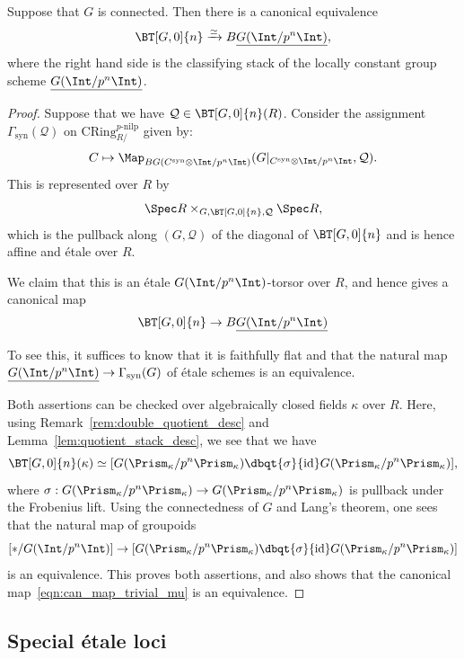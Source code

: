 \documentclass[10pt]{amsart}
\begin{document}
\begin{proposition}
\label{prop:trivial_mu}
Suppose that $G$ is connected. Then there is a canonical equivalence
\[
\BT[G,0]{n}\xrightarrow{\simeq}B\underline{G(\Int/p^n\Int)},
\]
where the right hand side is the classifying stack of the locally constant group scheme $\underline{G(\Int/p^n\Int)}$.
\end{proposition}
\begin{proof}
Suppose that we have $\mathcal{Q}\in \BT[G,0]{n}(R)$. Consider the assignment $\Gamma_{\mathrm{syn}}(\mathcal{Q})$ on $\mathrm{CRing}^{p\text{-nilp}}_{R/}$ given by:
\[
C\mapsto \Map_{BG(C^{\mathrm{syn}}\otimes\Int/p^n\Int)}(G\rvert_{C^{\mathrm{syn}}\otimes\Int/p^n\Int},\mathcal{Q}).   
\]
This is represented over $R$ by
\[
\Spec R\times_{G,\BT[G,0]{n},\mathcal{Q}}\Spec R,
\]
which is the pullback along $(G,\mathcal{Q})$ of the diagonal of $\BT[G,0]{n}$ and is hence affine and \'etale over $R$.

We claim that this is an \'etale $G(\Int/p^n\Int)$-torsor over $R$, and hence gives a canonical map
\begin{align}\label{eqn:can_map_trivial_mu}
\BT[G,0]{n}\to B\underline{G(\Int/p^n\Int)}
\end{align}

To see this, it suffices to know that it is faithfully flat and that the natural map $\underline{G(\Int/p^n\Int)}\to \Gamma_{\mathrm{syn}}(G)$ of \'etale schemes is an equivalence.

Both assertions can be checked over algebraically closed fields $\kappa$ over $R$. Here, using Remark~\ref{rem:double_quotient_desc} and Lemma~\ref{lem:quotient_stack_desc}, we see that we have
\[
\BT[G,0]{n}(\kappa)\simeq [G(\Prism_{\kappa}/p^n\Prism_{\kappa})\dbqt{\sigma}{\mathrm{id}}G(\Prism_{\kappa}/p^n\Prism_{\kappa})],
\]
where $\sigma:G(\Prism_{\kappa}/p^n\Prism_{\kappa})\to G(\Prism_{\kappa}/p^n\Prism_{\kappa})$ is pullback under the Frobenius lift. Using the connectedness of $G$ and Lang's theorem, one sees that the natural map of groupoids
\[
[*/G(\Int/p^n\Int)]\to [G(\Prism_{\kappa}/p^n\Prism_{\kappa})\dbqt{\sigma}{\mathrm{id}}G(\Prism_{\kappa}/p^n\Prism_{\kappa})]
\]
is an equivalence. This proves both assertions, and also shows that the canonical map~\eqref{eqn:can_map_trivial_mu} is an equivalence.
\end{proof}

\subsection{Special \'etale loci}
\label{subsec:special_open}
\end{document}
